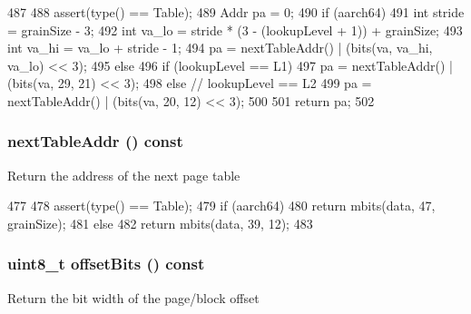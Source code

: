 \begin{DoxyCode}
487         {
488             assert(type() == Table);
489             Addr pa = 0;
490             if (aarch64) {
491                 int stride = grainSize - 3;
492                 int va_lo = stride * (3 - (lookupLevel + 1)) + grainSize;
493                 int va_hi = va_lo + stride - 1;
494                 pa = nextTableAddr() | (bits(va, va_hi, va_lo) << 3);
495             } else {
496                 if (lookupLevel == L1)
497                     pa = nextTableAddr() | (bits(va, 29, 21) << 3);
498                 else  // lookupLevel == L2
499                     pa = nextTableAddr() | (bits(va, 20, 12) << 3);
500             }
501             return pa;
502         }
\end{DoxyCode}
\hypertarget{classArmISA_1_1TableWalker_1_1LongDescriptor_a69898330efaf097540fa36f1f94b5c41}{
\subsubsection[{nextTableAddr}]{ nextTableAddr () const}}
\label{classArmISA_1_1TableWalker_1_1LongDescriptor_a69898330efaf097540fa36f1f94b5c41}
Return the address of the next page table 


\begin{DoxyCode}
477         {
478             assert(type() == Table);
479             if (aarch64)
480                 return mbits(data, 47, grainSize);
481             else
482                 return mbits(data, 39, 12);
483         }
\end{DoxyCode}
\hypertarget{classArmISA_1_1TableWalker_1_1LongDescriptor_ae34090e6c4584fabe4d885ae7b2e31d0}{
\subsubsection[{offsetBits}]{\setlength{\rightskip}{0pt plus 5cm}uint8\_\-t offsetBits () const}}
\label{classArmISA_1_1TableWalker_1_1LongDescriptor_ae34090e6c4584fabe4d885ae7b2e31d0}
Return the bit width of the page/block offset 

